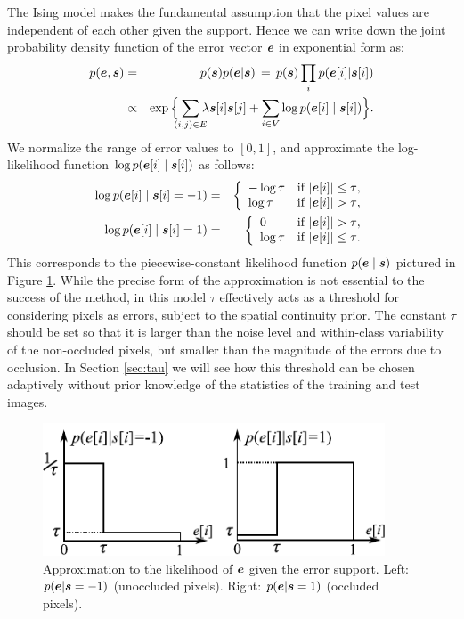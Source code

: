 The Ising model makes the fundamental assumption that the pixel values are independent of each other given the support. Hence we can write down the joint probability density function of the error vector $\boldsymbol{e}$ in exponential form as:
\begin{eqnarray*}
p(\e,\s) &=& p(\s) p(\e|\s) \,=\, p(\s) \prod_i p(\e[i]|\s[i]) \\
&\propto&  \exp\Big\{\hspace{-2mm}\sum_{(i,j)\in E} \hspace{-2mm}\lambda\s[i]\s[j] +
\sum_{i\in V} \log p(\e[i] \mid \s[i]) \Big\}.
\end{eqnarray*}
We normalize the range of error values to $[0,1]$, and approximate the log-likelihood function $\log p(\boldsymbol{e}[i]\mid\boldsymbol{s}[i])$ as follows:
\begin{eqnarray*}
\log p(\boldsymbol{e}[i] \mid \boldsymbol{s}[i]=-1) &=& \left\{ \begin{array}{ll}
-\log \tau & \textrm{if $|\boldsymbol{e}[i]| \le \tau$},\\
\log \tau & \textrm{if $|\boldsymbol{e}[i]| >\tau$},
\end{array} \right. \\
\log p(\boldsymbol{e}[i] \mid \boldsymbol{s}[i]=1) &=& \left\{ \begin{array}{ll}
0 & \textrm{if $|\boldsymbol{e}[i]| > \tau$},\\
\log \tau & \textrm{if $|\boldsymbol{e}[i]| \le \tau$}.
\end{array} \right.
\end{eqnarray*}
This corresponds to the piecewise-constant likelihood function $p(\boldsymbol{e}\mid \boldsymbol{s})$ pictured in Figure \ref{fig:likelihood}. While the precise form of the approximation is not essential to the success of the method, in this model $\tau$ effectively acts as a threshold for considering pixels as errors, subject to the spatial continuity prior. The constant $\tau$ should be set so that it is larger than the noise level and within-class variability of the non-occluded pixels, but smaller than the magnitude of the errors due to occlusion.  In Section \ref{sec:tau} we will see how this threshold can be chosen adaptively without prior knowledge of the statistics of the training and test images.
\begin{figure}
\centerline{\includegraphics[width=4.0in]{figures_iccv/function.pdf}}
\caption{Approximation to the likelihood of $\boldsymbol{e}$ given the error support. Left: $p(\boldsymbol{e}|\boldsymbol{s} = -1)$ (unoccluded pixels). Right: $p(\boldsymbol{e}|\boldsymbol{s} = 1)$ (occluded pixels).} \label{fig:likelihood} \vspace{0mm}
\end{figure}

